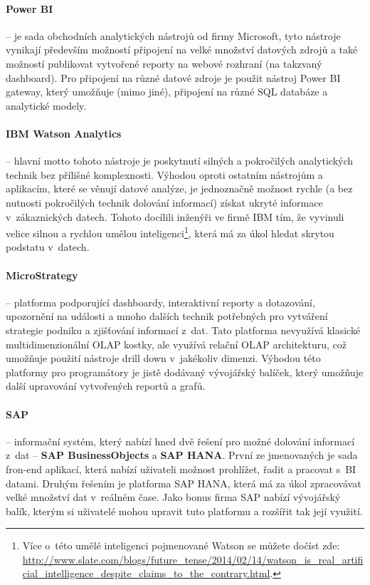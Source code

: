\paragraph{Power BI} -- je sada obchodních analytických nástrojů od firmy Microsoft, tyto nástroje vynikají především možností připojení na velké množství datových zdrojů a také možností publikovat vytvořené reporty na webové rozhraní (na takzvaný dashboard). Pro připojení na různé datové zdroje je použit nástroj Power BI gateway, který umožňuje (mimo jiné), připojení na různé SQL databáze a analytické modely. \cite{powerbi}

\paragraph{IBM Watson Analytics} -- hlavní motto tohoto nástroje je poskytnutí silných a pokročilých analytických technik bez přílišné komplexnosti. Výhodou oproti ostatním nástrojům a aplikacím, které se věnují datové analýze, je jednoznačně možnost rychle (a bez nutnosti pokročilých technik dolování informací) získat ukryté informace v~zákaznických datech. Tohoto docílili inženýři ve firmě IBM tím, že vyvinuli velice silnou a rychlou umělou inteligenci\footnote{Více o~této umělé inteligenci pojmenované Watson se můžete dočíst zde: \url{http://www.slate.com/blogs/future_tense/2014/02/14/watson_is_real_artificial_intelligence_despite_claims_to_the_contrary.html}.}, která má za úkol hledat skrytou podstatu v~datech. \cite{watson}

\paragraph{MicroStrategy} -- platforma podporující dashboardy, interaktivní reporty a dotazování, upozornění na události a mnoho dalších technik potřebných pro vytváření strategie podniku a zjišťování informací z~dat. Tato platforma nevyužívá klasické multidimenzionální OLAP kostky, ale využívá relační OLAP architekturu, což umožňuje použití nástroje drill down v~jakékoliv dimenzi. Výhodou této platformy pro programátory je jistě dodávaný vývojářský balíček, který umožňuje další upravování vytvořených reportů a grafů. \cite{microstrategy}

\paragraph{SAP} -- informační systém, který nabízí hned dvě řešení pro možné dolování informací z~dat -- \textbf{SAP BusinessObjects} a \textbf{SAP HANA}. První ze jmenovaných je sada fron-end aplikací, která nabízí uživateli možnost prohlížet, řadit a pracovat s~BI datami. Druhým řešením je platforma SAP HANA, která má za úkol zpracovávat velké množství dat v~reálném čase. Jako bonus firma SAP nabízí vývojářský balík, kterým si uživatelé mohou upravit tuto platformu a rozšířit tak její využití. \cite{sap}

